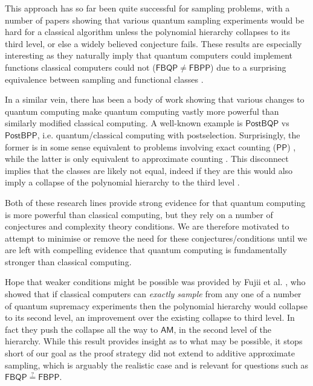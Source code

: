 \documentclass{article}
\begin{document}
This approach has so far been quite successful for sampling problems, with a number of papers \cite{aaronson2011computational, bremner2016average} showing that various quantum sampling experiments would be hard for a classical algorithm unless the polynomial hierarchy collapses to its third level, or else a widely believed conjecture fails. These results are especially interesting as they naturally imply that quantum computers could implement functions classical computers could not ($\mathsf{FBQP \neq FBPP}$) due to a surprising equivalence between sampling and functional classes \cite{aaronson2014equivalence}.

In a similar vein, there has been a body of work showing that various changes to quantum computing make quantum computing vastly more powerful than similarly modified classical computing. A well-known example is $\mathsf{PostBQP}$ vs $\mathsf{PostBPP}$, i.e. quantum/classical computing with postselection. Surprisingly, the former is in some sense equivalent to problems involving exact counting ($\mathsf{PP}$) \cite{aaronson2005postBQP}, while the latter is only equivalent to approximate counting \cite{o2018weakness}. 
This disconnect implies that the classes are likely not equal, indeed if they are this would also imply a collapse of the polynomial hierarchy to the third level \cite{aaronson2005postBQP}.

Both of these research lines provide strong evidence for that quantum computing is more powerful than classical computing, but they rely on a number of conjectures and complexity theory conditions.
We are therefore motivated to attempt to minimise or remove the need for these conjectures/conditions until we are left with compelling evidence that quantum computing is fundamentally stronger than classical computing.


Hope that weaker conditions might be possible was provided by Fujii et al. \cite{fujii2015power}, who showed that if classical computers can \textit{exactly sample} from any one of a number of quantum supremacy experiments then the polynomial hierarchy would collapse to its second level, an improvement over the existing collapse to third level. In fact they push the collapse all the way to $\mathsf{AM}$, in the second level of the hierarchy.
While this result provides insight as to what may be possible, it stops short of our goal as the proof strategy did not extend to additive approximate sampling, which is arguably the realistic case \cite{aaronson2011computational} and is relevant for questions such as $\mathsf{FBQP\stackrel{?}{=}FBPP}$.
\end{document}
